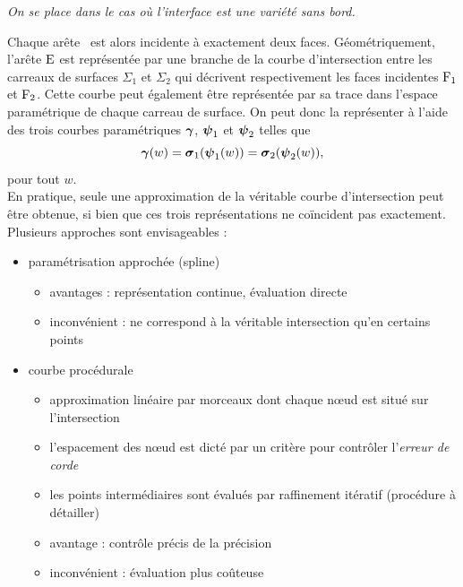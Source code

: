 \par\bigskip
\textit{On se place dans le cas où l'interface est une variété sans bord.}\par
Chaque arête \brep\ est alors incidente à exactement deux faces. 
Géométriquement, l'arête $\mathrm{E}$ est représentée par une branche de la courbe d'intersection entre les carreaux de surfaces $\Sigma_1$ et $\Sigma_2$ qui décrivent respectivement les faces incidentes $\mathrm{F}_1$ et $\mathrm{F}_2$. 
Cette courbe peut également être représentée par sa trace dans l'espace paramétrique de chaque carreau de surface. 
On peut donc la représenter à l'aide des trois courbes paramétriques $\boldsymbol{\gamma}$, $\boldsymbol{\psi}_1$ et $\boldsymbol{\psi}_2$ telles que
\begin{equation}
	\boldsymbol{\gamma}(w) = \boldsymbol{\sigma}_1(\boldsymbol{\psi}_1(w)) = \boldsymbol{\sigma}_2(\boldsymbol{\psi}_2(w)),
\end{equation}
pour tout $w$.\\
En pratique, seule une approximation de la véritable courbe d'intersection peut être obtenue, si bien que ces trois représentations ne coïncident pas exactement.
Plusieurs approches sont envisageables :
\begin{itemize}
	\item paramétrisation approchée (\eg spline)
	\begin{itemize}
		\item avantages : représentation continue, évaluation directe
		\item inconvénient : ne correspond à la véritable intersection qu'en certains points
	\end{itemize}
	\item courbe procédurale
	\begin{itemize}
		\item approximation linéaire par morceaux dont chaque n\oe ud est situé  sur l'intersection
		\item l'espacement des n\oe ud est dicté par un critère pour contrôler l'\textit{erreur de corde}
		\item les points intermédiaires sont évalués par raffinement itératif (procédure à détailler)
		\item avantage : contrôle précis de la précision
		\item inconvénient : évaluation plus coûteuse 
	\end{itemize}
\end{itemize}



